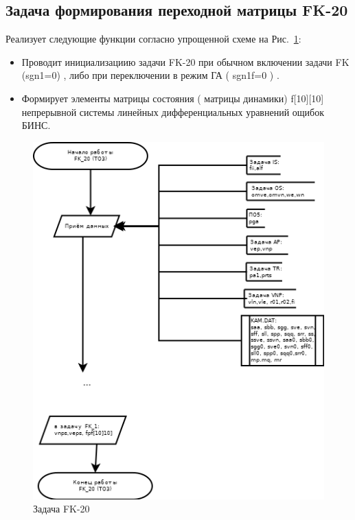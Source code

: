\subsection{Задача формирования переходной матрицы FK-20}
Реализует следующие функции согласно упрощенной схеме на Рис.~\ref{fig:FK-20}:
\begin{itemize}
\item Проводит инициализациию задачи FK-20 при обычном включении задачи FK (sgn1=0) , либо при  переключении в режим  ГА  ( sgn1f=0 ) .
\item Формирует элементы  матрицы состояния ( матрицы динамики)   f[10][10]  непрерывной системы  линейных дифференциальных уравнений ощибок  БИНС.
\end{itemize}
\begin{figure}[H]
    \centering
    \includegraphics[width=0.75\linewidth]{images/FK_20_simple.png}
    \caption{Задача FK-20}
    \label{fig:FK-20}
\end{figure}
